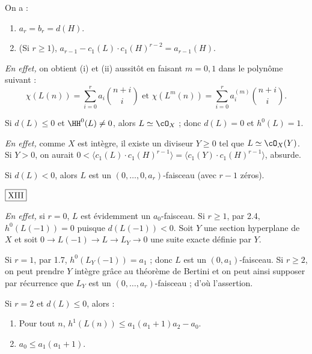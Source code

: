 \begin{lem}\label{lem:2.3} On a :
\begin{enumerate}[label={\roman*)}]
\item $a_r = b_r = d(H)$.
\item (Si $r \geq 1$), $a_{r-1} - c_1(L) \cdot c_1(H)^{r-2} = a_{r-1}(H)$.
\end{enumerate}
\end{lem}

\noindent\textit{En effet,} on obtient (i) et (ii) aussitôt en faisant $m = 0, 1$ dans le polynôme suivant :
\[
\chi(L(n)) = \sum_{i=0}^{r} a_i \binom{n+i}{i} \text{ et } \chi(L^m(n)) = \sum_{i=0}^{r} a_i^{(m)} \binom{n+i}{i}.
\]

\begin{lem}\label{lem:2.4} Si $d(L) \leq 0$ et $\HH^0(L) \neq 0$, alors $L \simeq \cO_X$ ; donc $d(L) = 0$ et $h^0(L) = 1$.
\end{lem}

\noindent\textit{En effet,} comme $X$ est intègre, il existe un diviseur $Y \geq 0$ tel que $L \simeq \cO_X(Y)$. Si $Y > 0$, on aurait $0 < \langle c_1(L) \cdot c_1(H)^{r-1} \rangle = \langle c_1(Y) \cdot c_1(H)^{r-1} \rangle$, absurde.

\begin{lem}\label{lem:2.5} Si $d(L) < 0$, alors $L$ est un $(0, \ldots, 0, a_r)$-faisceau (avec $r-1$ zéros).
\end{lem}

\begin{flushright}
$\fbox{\text{XIII}}$
\end{flushright}

\noindent\textit{En effet,} si $r=0$, $L$ est évidemment un $a_0$-faisceau. Si $r \geq 1$, par 2.4, $h^0(L(-1)) = 0$ puisque $d(L(-1)) < 0$. Soit $Y$ une section hyperplane de $X$ et soit $0 \to L(-1) \to L \to L_Y \to 0$ une suite exacte définie par $Y$.

Si $r=1$, par 1.7, $h^0(L_Y(-1)) = a_1$ ; donc $L$ est un $(0, a_1)$-faisceau. Si $r \geq 2$, on peut prendre $Y$ intègre grâce au théorème de Bertini et on peut ainsi supposer par récurrence que $L_Y$ est un $(0, \ldots, a_r)$-faisceau ; d'où l'assertion.

\begin{lem}\label{lem:2.7} Si $r = 2$ et $d(L) \leq 0$, alors :
\begin{enumerate}[label={\roman*)}]
\item Pour tout $n$, $h^1(L(n)) \leq a_1(a_1+1)a_2 - a_0$.
\item $a_0 \leq a_1(a_1+1)$.
\end{enumerate}
\end{lem}

